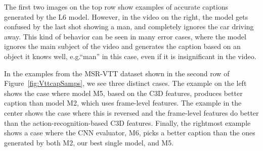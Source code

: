 The first two images on the top row show examples of accurate captions
generated by the L6 model.
However, in the video on the right, the model gets confused by the last shot
showing a man, and completely ignores the car driving away.
This kind of behavior can be seen in many error cases, where the model
ignores the main subject of the video and generates the caption based on an
object it knows well, e.g.\@ ``man'' in this case, even if it is insignificant
in the video.

In the examples from the MSR-VTT dataset shown in the second row of
Figure~\ref{fig:VttcapSamps}, we see three distinct cases.
The example on the left shows the case where model M5, based on the C3D
features, produces better caption than model M2, which uses frame-level
features.
The example in the center shows the case where this is reversed and the
frame-level features do better than the action-recognition-based C3D features.
Finally, the rightmost example shows a case where the CNN evaluator, M6, picks
a better caption than the ones generated by both M2, our best single model, and
M5.

